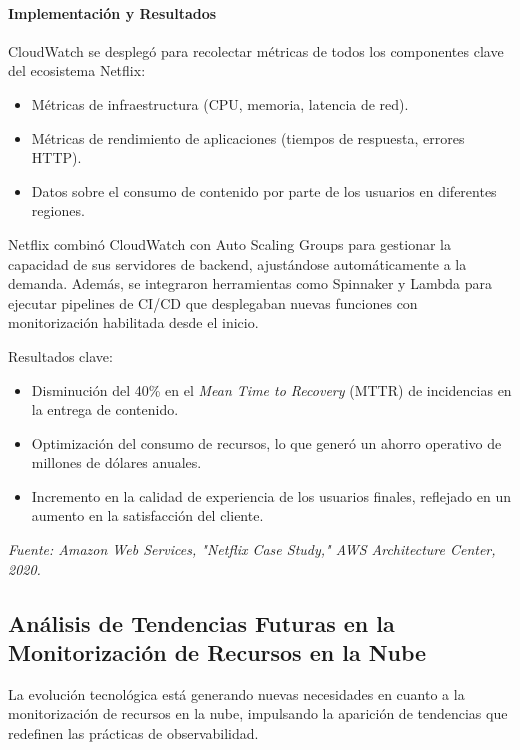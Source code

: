 {                \paragraph{Implementación y Resultados}  
                CloudWatch se desplegó para recolectar métricas de todos los componentes clave del ecosistema Netflix:
                \begin{itemize}
                    \item Métricas de infraestructura (CPU, memoria, latencia de red).
                    \item Métricas de rendimiento de aplicaciones (tiempos de respuesta, errores HTTP).
                    \item Datos sobre el consumo de contenido por parte de los usuarios en diferentes regiones.
                \end{itemize}
                
                Netflix combinó CloudWatch con Auto Scaling Groups para gestionar la capacidad de sus servidores de backend, ajustándose automáticamente a la demanda. Además, se integraron herramientas como Spinnaker y Lambda para ejecutar pipelines de CI/CD que desplegaban nuevas funciones con monitorización habilitada desde el inicio.
                
                Resultados clave:
                \begin{itemize}
                    \item Disminución del 40\% en el \textit{Mean Time to Recovery} (MTTR) de incidencias en la entrega de contenido.
                    \item Optimización del consumo de recursos, lo que generó un ahorro operativo de millones de dólares anuales.
                    \item Incremento en la calidad de experiencia de los usuarios finales, reflejado en un aumento en la satisfacción del cliente.
                \end{itemize}
                
                \begin{flushright}
                \textit{Fuente: Amazon Web Services, "Netflix Case Study," AWS Architecture Center, 2020.}
                \end{flushright}
            
        \subsection{Análisis de Tendencias Futuras en la Monitorización de Recursos en la Nube}
            La evolución tecnológica está generando nuevas necesidades en cuanto a la monitorización de recursos en la nube, impulsando la aparición de tendencias que redefinen las prácticas de observabilidad.
            
}
